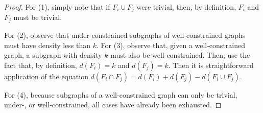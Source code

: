 \begin{proof}
For (1), simply note that if $F_i\cup F_j$ were trivial, then, by definition, $F_i$ and $F_j$ must be trivial.

For (2), observe that under-constrained subgraphs of well-constrained graphs must have density less than $k$. For (3), observe that, given a well-constrained graph, a subgraph with density $k$ must also be well-constrained. Then, use the fact that, by definition, $d(F_i)=k$ and $d(F_j)=k$. Then it is straightforward application of the equation $d(F_i\cap F_j)=d(F_i)+d(F_j)-d(F_i\cup F_j)$.

For (4), because subgraphs of a well-constrained graph can only be trivial, under-, or well-constrained, all cases have already been exhausted.
\end{proof}







